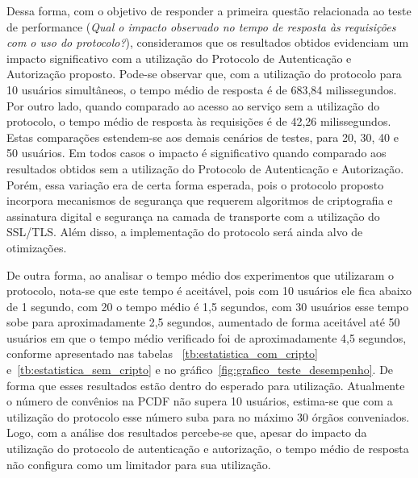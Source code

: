 Dessa forma, com o objetivo de responder a primeira questão relacionada ao teste de performance
(\emph{Qual o impacto observado no tempo de resposta às requisições com o uso do protocolo?}),
consideramos que os resultados obtidos evidenciam um impacto significativo com a utilização do Protocolo de Autenticação e Autorização proposto.
Pode-se observar que, com a utilização do protocolo para 10 usuários simultâneos, o tempo médio de resposta é de 683,84 milissegundos.
Por outro lado, quando comparado ao acesso ao serviço sem a utilização do protocolo, o tempo médio de resposta às requisições é de 42,26 milissegundos.
Estas comparações estendem-se aos demais cen\'{a}rios de testes, para 20, 30, 40 e 50 usuários. Em todos casos o impacto é significativo quando comparado aos resultados obtidos sem a utilização do Protocolo de Autenticação e Autorização. Porém, essa variação era de certa forma esperada, pois o protocolo proposto incorpora mecanismos de segurança que requerem algoritmos de criptografia e assinatura digital e segurança na camada de transporte com a utilização do SSL/TLS. Além disso, a implementação do protocolo será ainda alvo de otimizações.

De outra forma, ao analisar o tempo médio dos experimentos que utilizaram o protocolo, nota-se que este tempo é aceitável, pois com 10 usuários ele fica abaixo de 1 segundo, com 20 o tempo médio é 1,5 segundos, com 30 usuários esse tempo sobe para aproximadamente 2,5 segundos, aumentado de forma aceitável até 50 usuários em que o tempo médio verificado foi de aproximadamente 4,5 segundos, conforme apresentado nas tabelas ~\ref{tb:estatistica_com_cripto} e~\ref{tb:estatistica_sem_cripto} e no gráfico~\ref{fig:grafico_teste_desempenho}. De forma que esses resultados estão dentro do esperado para utilização. Atualmente o número de convênios na PCDF não supera 10 usuários, estima-se que com a utilização do protocolo esse número suba para no máximo 30 órgãos conveniados. Logo, com a análise dos resultados percebe-se que, apesar do impacto da utilização do protocolo de autenticação e autorização, o tempo médio de resposta não configura como um limitador para sua utilização. %


